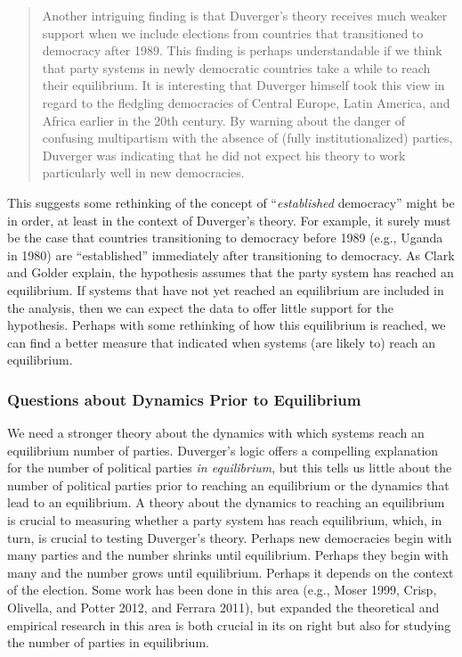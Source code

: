 \documentclass[12pt]{article}
\begin{document}
\begin{quote}
Another intriguing finding is that Duverger's theory receives much weaker support when we include elections from countries that transitioned to democracy after 1989. 
This finding is perhaps understandable if we think that party systems in newly democratic countries take a while to reach their equilibrium. 
It is interesting that Duverger himself took this view in regard to the fledgling democracies of Central Europe, Latin America, and Africa earlier in the 20th century. 
By warning about the danger of confusing multipartism with the absence of (fully institutionalized) parties, Duverger was indicating that he did not expect his theory to work particularly well in new democracies. 
\end{quote}

This suggests some rethinking of the concept of ``\textit{established} democracy'' might be in order, at least in the context of Duverger's theory. 
For example, it surely must be the case that countries transitioning to democracy before 1989 (e.g., Uganda in 1980) are ``established'' immediately after transitioning to democracy. 
As Clark and Golder explain, the hypothesis assumes that the party system has reached an equilibrium. If systems that have not yet reached an equilibrium are included in the analysis, then we can expect the data to offer little support for the hypothesis. 
Perhaps with some rethinking of how this equilibrium is reached, we can find a better measure that indicated when systems (are likely to) reach an equilibrium.


\subsubsection*{Questions about Dynamics Prior to Equilibrium}

We need a stronger theory about the dynamics with which systems reach an equilibrium number of parties. Duverger's logic offers a compelling explanation for the number of political parties \textit{in equilibrium}, but this tells us little about the number of political parties prior to reaching an equilibrium or the dynamics that lead to an equilibrium. 
A theory about the dynamics to reaching an equilibrium is crucial to measuring whether a party system has reach equilibrium, which, in turn, is crucial to testing Duverger's theory. 
Perhaps new democracies begin with many parties and the number shrinks until equilibrium. 
Perhaps they begin with many and the number grows until equilibrium. 
Perhaps it depends on the context of the election. 
Some work has been done in this area (e.g.,  Moser 1999, Crisp, Olivella, and Potter 2012, and Ferrara 2011), but expanded the theoretical and empirical research in this area is both crucial in its on right but also for studying the number of parties in equilibrium. 
\end{document}
